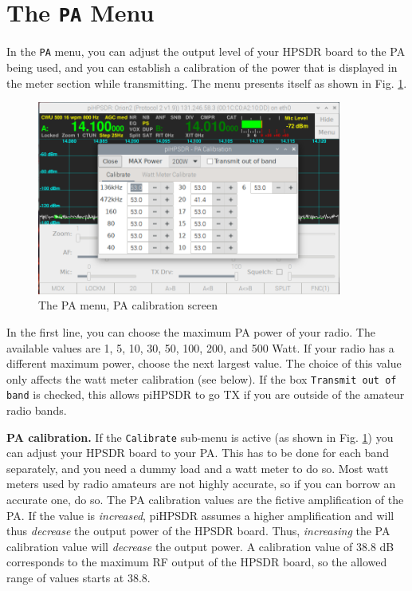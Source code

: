 \documentclass[12pt]{book}
\def\rett#1{\texttt{\color{red}#1}}
\def\bltt#1{\texttt{\color{blue}#1}}
\def\pH{pi\-HPSDR }
\begin{document}
\section{The \texttt{PA} Menu}

In the \bltt{PA} menu, you can adjust the output level of your HPSDR board
to the PA being used, and you can establish a calibration of the
power that is displayed in the meter section while transmitting.
The menu presents itself as shown in Fig. \ref{fig:PAMenuCalibrate}.

\begin{figure}[ht]
\center
\includegraphics[width=10cm]{PAmenuCalibrate.png}
\caption{The PA menu, PA calibration screen}
\label{fig:PAMenuCalibrate}
\end{figure}

In the first line, you can choose the maximum PA power of your
radio. The available values are 1, 5, 10, 30, 50, 100, 200, and
500 Watt. If your radio has a different maximum power, choose the
next largest value. The choice of this value only affects the
watt meter calibration (see below). If the  box
\rett{Transmit out of band} is checked, this allows \pH
to go TX if you are outside of the amateur radio bands.



\textbf{PA calibration.} If the \rett{Calibrate} sub-menu is active
(as shown in Fig. \ref{fig:PAMenuCalibrate}) you can adjust your
HPSDR board to your PA. This has to be done for each band separately,
and you need a dummy load and a watt meter to do so. Most watt meters
used by radio amateurs are not highly accurate, so if you can borrow
an accurate one, do so. The PA calibration values are the fictive
amplification of the PA. If the value is \textit{increased},
\pH assumes a higher amplification and will thus \textit{decrease}
the output power of the HPSDR board. Thus, \textit{increasing} the
PA calibration value will \textit{decrease} the output power. A calibration
value of 38.8 dB corresponds to the maximum RF output of the HPSDR board,
so the allowed range of values starts at 38.8.
\end{document}
